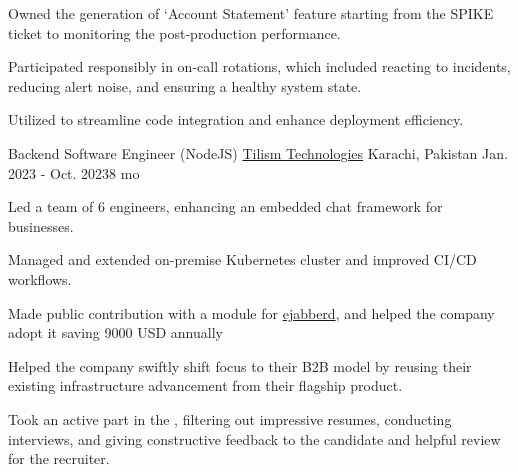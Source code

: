 \begin{cventries}
{\begin{cvitems}
      \item {Owned the generation of `Account Statement' feature starting from the SPIKE ticket to monitoring the post-production performance.}
      \item {Participated responsibly in on-call rotations, which included reacting to incidents, reducing alert noise, and ensuring a healthy system state.}
      \item {Utilized  to streamline code integration and enhance deployment efficiency.}
    \end{cvitems}
  }
      
  \cventry
  {Backend Software Engineer (NodeJS)} %
  {\href{https://www.tilismtech.com/}{Tilism Technologies}} %
  {Karachi, Pakistan} %
  {Jan. 2023 - Oct. 2023{\enskip\cdotp\enskip}8 mo} %
  {
    \begin{cvitems} %
      \item {Led a team of 6 engineers, enhancing an embedded chat framework for businesses.}
      \item {Managed and extended on-premise Kubernetes cluster and improved CI/CD workflows.}
      \item {Made public contribution with a module for \href{https://github.com/processone/ejabberd-contrib/pull/311}{\textcolor{awesome}{ejabberd}}, and helped the company adopt it saving 9000 USD annually}
      \item {Helped the company swiftly shift focus to their B2B model by reusing their existing infrastructure advancement from their flagship product.}
      \item {Took an active part in the , filtering out impressive resumes, conducting interviews, and giving constructive feedback to the candidate and helpful review for the recruiter.}
    \end{cvitems}
  }


\end{cventries}
